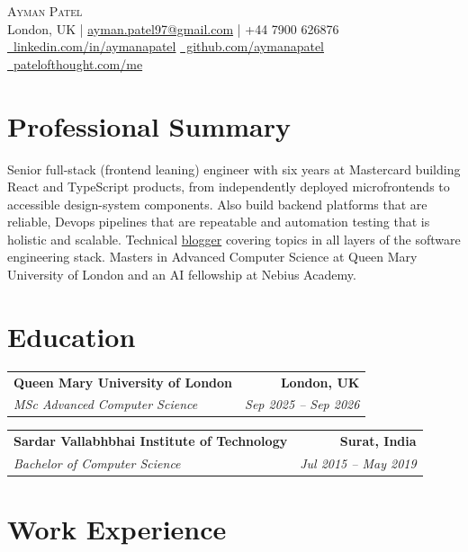 \documentclass[letterpaper,10pt]{article}
\makeatletter
\newcommand{\resumeEducation}[4]{%
  \noindent\begin{tabular*}{\textwidth}{@{}l@{\extracolsep{\fill}}r@{}}
    \textbf{#1} & \textbf{#2}\\[-1pt]
    \textit{#3} & \textit{#4}
  \end{tabular*}\vspace{-2pt}
}
\makeatother
\begin{document}
\begin{center}
  {\Huge\scshape Ayman Patel}\\[1pt]
  \small London, UK \;|\; \href{mailto:ayman.patel97@gmail.com}{ayman.patel97@gmail.com} \;|\; +44 7900 626876\\[-1pt]
  \small \href{https://linkedin.com/in/aymanapatel}{\faLinkedin\ linkedin.com/in/aymanapatel}
  \quad \href{https://github.com/aymanapatel}{\faGithub\ github.com/aymanapatel}
  \quad \href{https://patelofthought.com/me}{\faGlobe\ patelofthought.com/me}
\end{center}
\vspace{-10pt}

\section{Professional Summary}
Senior full-stack (frontend leaning) engineer with six years at Mastercard building React and TypeScript products, from independently deployed microfrontends to accessible design-system components. Also build backend platforms that are reliable, Devops pipelines that are repeatable and automation testing that is holistic and scalable. Technical \href{https://aymanace2049.hashnode.dev}{blogger} covering topics in all layers of the software engineering stack.
Masters in Advanced Computer Science at Queen Mary University of London and an AI fellowship at Nebius Academy.

\section{Education}
\resumeEducation{Queen Mary University of London}{London, UK}{MSc Advanced Computer Science}{Sep 2025 -- Sep 2026}
\resumeEducation{Sardar Vallabhbhai Institute of Technology}{Surat, India}{Bachelor of Computer Science}{Jul 2015 -- May 2019}

\section{Work Experience}
\end{document}
